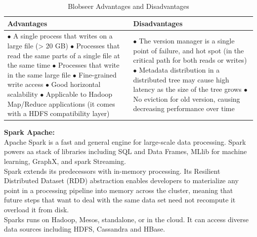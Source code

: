 \begin{table}[H]
\caption{Blobseer Advantages and Disadvantages}
\begin{center}
\begin{tabularx}{17cm}{ |p{8.5cm}|X| } 
 \hline
 \textbf{Advantages} & \textbf{Disadvantages}  \\ \hline
 $\bullet$ A single process that writes on a large file (> 20 GB) \newline $\bullet$ Processes that read the same parts of a single file at the same time \newline $\bullet$ Processes that write in the same large file \newline $\bullet$ Fine-grained write access \newline $\bullet$ Good horizontal scalability \newline $\bullet$ Applicable to Hadoop Map/Reduce applications (it comes with a HDFS compatibility layer) & $\bullet$ The version manager is a single point of failure, and hot spot (in the critical path for both reads or writes) \newline $\bullet$ Metadata distribution in a distributed tree may cause high latency as the size of the tree grows \newline $\bullet$ No eviction for old version, causing decreasing performance over time  \\ \hline

\end{tabularx}
\end{center}
\end{table}

\textbf{\normalsize{Spark Apache:}}\\

Apache Spark is a fast and general engine for large-scale data processing. Spark powers aa stack of libraries including SQL and Data Frames, MLlib for machine learning, GraphX, and spark Streaming.\\

Spark extends its predecessors with in-memory processing. Its Resilient Distributed Dataset (RDD) abstraction enables developers to materialize any point in a processing pipeline into memory across the cluster, meaning that future steps that want to deal with the same data set need not recompute it overload it from disk.\\

Sparks runs on Hadoop, Mesos, standalone, or in the cloud. It can access diverse data sources including HDFS, Cassandra and HBase.

